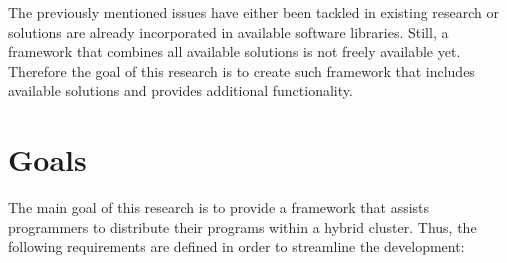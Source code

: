 The previously mentioned issues have either been tackled in existing research or solutions are already incorporated in available software libraries. Still, a framework that combines all available solutions is not freely available yet. Therefore the goal of this research is to create such framework that includes available solutions and provides additional functionality.

\section{Goals}

The main goal of this research is to provide a framework that assists programmers to distribute their programs within a hybrid cluster. Thus, the following requirements are defined in order to streamline the development:

